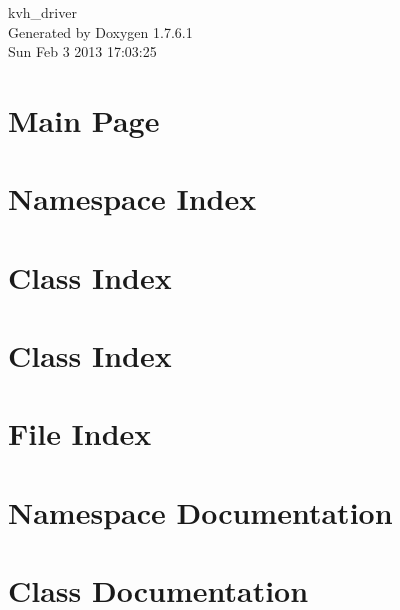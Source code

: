 \documentclass[a4paper]{book}
\begin{document}
\begin{titlepage}
\vspace*{7cm}
\begin{center}
{\Large kvh\-\_\-driver }\\
\vspace*{1cm}
{\large \-Generated by Doxygen 1.7.6.1}\\
\vspace*{0.5cm}
{\small Sun Feb 3 2013 17:03:25}\\
\end{center}
\end{titlepage}
\clearemptydoublepage
{}
\tableofcontents
\clearemptydoublepage
{}
\chapter{\-Main \-Page}
\label{index}
\chapter{\-Namespace \-Index}

\chapter{\-Class \-Index}

\chapter{\-Class \-Index}

\chapter{\-File \-Index}

\chapter{\-Namespace \-Documentation}







\chapter{\-Class \-Documentation}











\end{document}
